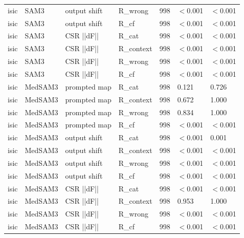 \begin{tabular}{llllrll}
isic & SAM3 & output shift & R_wrong & 998 & $<$0.001 & $<$0.001 \\
isic & SAM3 & output shift & R_cf & 998 & $<$0.001 & $<$0.001 \\
isic & SAM3 & CSR  ||dF|| & R_cat & 998 & $<$0.001 & $<$0.001 \\
isic & SAM3 & CSR  ||dF|| & R_context & 998 & $<$0.001 & $<$0.001 \\
isic & SAM3 & CSR  ||dF|| & R_wrong & 998 & $<$0.001 & $<$0.001 \\
isic & SAM3 & CSR  ||dF|| & R_cf & 998 & $<$0.001 & $<$0.001 \\
isic & MedSAM3 & prompted map & R_cat & 998 & 0.121 & 0.726 \\
isic & MedSAM3 & prompted map & R_context & 998 & 0.672 & 1.000 \\
isic & MedSAM3 & prompted map & R_wrong & 998 & 0.834 & 1.000 \\
isic & MedSAM3 & prompted map & R_cf & 998 & $<$0.001 & $<$0.001 \\
isic & MedSAM3 & output shift & R_cat & 998 & $<$0.001 & 0.001 \\
isic & MedSAM3 & output shift & R_context & 998 & $<$0.001 & $<$0.001 \\
isic & MedSAM3 & output shift & R_wrong & 998 & $<$0.001 & $<$0.001 \\
isic & MedSAM3 & output shift & R_cf & 998 & $<$0.001 & $<$0.001 \\
isic & MedSAM3 & CSR  ||dF|| & R_cat & 998 & $<$0.001 & $<$0.001 \\
isic & MedSAM3 & CSR  ||dF|| & R_context & 998 & 0.953 & 1.000 \\
isic & MedSAM3 & CSR  ||dF|| & R_wrong & 998 & $<$0.001 & $<$0.001 \\
isic & MedSAM3 & CSR  ||dF|| & R_cf & 998 & $<$0.001 & $<$0.001 \\
\bottomrule
\end{tabular}
